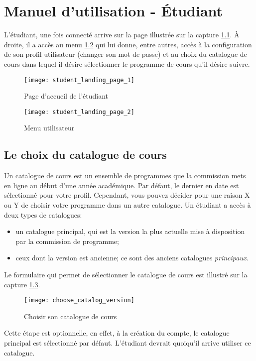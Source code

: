 \chapter{Manuel d'utilisation - Étudiant}
L'étudiant, une fois connecté arrive sur la page illustrée sur la capture \ref{fig:student_landing_page_manual}. À droite, il a accès au menu \ref{fig:user_menu} qui lui donne, entre autres, accès à la configuration de son profil utilisateur (changer son mot de passe) et au choix du catalogue de cours dans lequel il désire sélectionner le programme de cours qu'il désire suivre. 
\begin{figure}[htb]
\centering
\caption{Page d’accueil de l'étudiant}
\label{fig:student_landing_page_manual}
\texttt{[image: student\_landing\_page\_1]}
\end{figure}

\begin{figure}[htb]
\centering
\caption{Menu utilisateur}
\label{fig:user_menu}
\texttt{[image: student\_landing\_page\_2]}
\end{figure}
\section{Le choix du catalogue de cours}
Un catalogue de cours est un ensemble de programmes que la commission mets en ligne au début d'une année académique. Par défaut, le dernier en date est sélectionné pour votre profil. Cependant, vous pouvez décider pour une raison X ou Y de choisir votre programme dans un autre catalogue. Un étudiant a accès à deux types de catalogues: 


\begin{itemize}
\item un catalogue principal, qui est la version la plus actuelle mise à disposition par la commission de programme;
\item ceux dont la version est ancienne; ce sont des anciens catalogues \textit{principaux}.
\end{itemize}

Le formulaire qui permet de sélectionner le catalogue de cours est illustré sur la capture \ref{fig:choose_catalog_version}.

\begin{figure}
\centering
\caption{Choisir son catalogue de cours}
\label{fig:choose_catalog_version}
\texttt{[image: choose\_catalog\_version]}
\end{figure}

Cette étape est optionnelle, en effet, à la création du compte, le catalogue principal est sélectionné par défaut. L'étudiant devrait quoiqu'il arrive utiliser ce catalogue.


